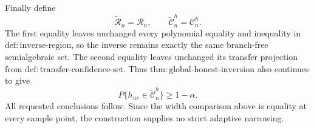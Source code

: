 Finally define
\[
 \widetilde{\mathcal R}_n=\mathcal R_n,
 \qquad
 \widetilde{\mathcal C}_n^h=\mathcal C_n^h.
\]
The first equality leaves unchanged every polynomial equality and inequality in \(\mathrm{def{:}inverse\mbox{-}region}\), so the inverse remains exactly the same branch-free semialgebraic set.  The second equality leaves unchanged its transfer projection from \(\mathrm{def{:}transfer\mbox{-}confidence\mbox{-}set}\).  Thus \(\mathrm{thm{:}global\mbox{-}honest\mbox{-}inversion}\) also continues to give
\[
 P\{h_{uv}\in\widetilde{\mathcal C}_n^h\}\geq1-\alpha.
\]
All requested conclusions follow.  Since the width comparison above is equality at every sample point, the construction supplies no strict adaptive narrowing.
